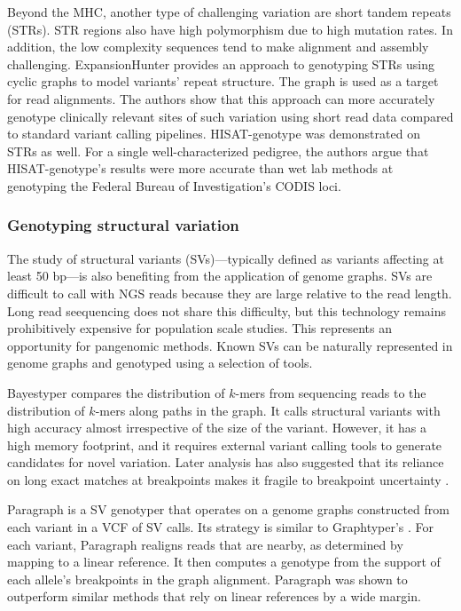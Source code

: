 Beyond the MHC, another type of challenging variation are short tandem repeats (STRs).
STR regions also have high polymorphism due to high mutation rates.
In addition, the low complexity sequences tend to make alignment and assembly challenging.
ExpansionHunter \cite{dolzhenko2019expansionhunter} provides an approach to genotyping STRs using cyclic graphs to model variants' repeat structure.
The graph is used as a target for read alignments.
The authors show that this approach can more accurately genotype clinically relevant sites of such variation using short read data compared to standard variant calling pipelines.
HISAT-genotype \cite{Kim_2019} was demonstrated on STRs as well. 
For a single well-characterized pedigree, the authors argue that HISAT-genotype's results were more accurate than wet lab methods at genotyping the Federal Bureau of Investigation's CODIS loci.

\subsubsection{Genotyping structural variation}

The study of structural variants (SVs)---typically defined as variants affecting at least 50 bp---is also benefiting from the application of genome graphs.
SVs are difficult to call with NGS reads because they are large relative to the read length.
Long read seequencing does not share this difficulty, but this technology remains prohibitively expensive for population scale studies.
This represents an opportunity for pangenomic methods.
Known SVs can be naturally represented in genome graphs and genotyped using a selection of tools.

Bayestyper \cite{sibbesen2018accurate} compares the distribution of $k$-mers from sequencing reads to the distribution of $k$-mers along paths in the graph.
It calls structural variants with high accuracy almost irrespective of the size of the variant.
However, it has a high memory footprint, and it requires external variant calling tools to generate candidates for novel variation.
Later analysis has also suggested that its reliance on long exact matches at breakpoints makes it fragile to breakpoint uncertainty \cite{hickey2019genotyping}.

Paragraph \cite{chen2019paragraph} is a SV genotyper that operates on a genome graphs constructed from each variant in a VCF of SV calls.
Its strategy is similar to Graphtyper's \cite{eggertsson2017graphtyper}.
For each variant, Paragraph realigns reads that are nearby, as determined by mapping to a linear reference.
It then computes a genotype from the support of each allele's breakpoints in the graph alignment.
Paragraph was shown to outperform similar methods that rely on linear references by a wide margin.


